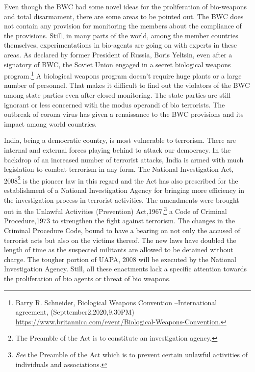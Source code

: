 \begin{multicols}{2}

\noi
Even though the BWC had some novel ideas for the proliferation of bio-weapons and total
disarmament, there are some areas to be pointed out. The BWC does not contain any
provision for monitoring the members about the compliance of the provisions. Still, in many
parts of the world, among the member countries themselves, experimentations in bio-agents
are going on with experts in these areas. As declared by former President of Russia, Boris
Yeltsin, even after a signatory of BWC, the Soviet Union engaged in a secret biological 
weapons program.\footnote{Barry R. Schneider, Biological Weapons Convention –International agreement, (Septtember2,2020,9.30PM) \url{https://www.britannica.com/event/Biological-Weapons-Convention.}} A biological weapons program doesn't require huge plants or a large
number of personnel. That makes it difficult to find out the violators of the BWC among state
parties even after closed monitoring. The state parties are still ignorant or less concerned with
the modus operandi of bio terrorists. The outbreak of corona virus has given a renaissance to
the BWC provisions and its impact among world countries.


\noi
India, being a democratic country, is most vulnerable to terrorism. There are internal and
external forces playing behind to attack our democracy. In the backdrop of an increased
number of terrorist attacks, India is armed with much legislation to combat terrorism in any
form. The National Investigation Act, 2008\footnote{The Preamble of the Act is to constitute an investigation agency.} is the pioneer law in this regard and the Act has also prescribed for the establishment of a National Investigation Agency for bringing more efficiency in the investigation process in terrorist activities. The amendments were brought
out in the Unlawful Activities (Prevention) Act,1967,\footnote{\textit{See} the Preamble of the Act which is to prevent certain unlawful activities of individuals and associations.} a Code of Criminal Procedure,1973 to
strengthen the fight against terrorism. The changes in the Criminal Procedure Code, bound to
have a bearing on not only the accused of terrorist acts but also on the victims thereof. The
new laws have doubled the length of time as the suspected militants are allowed to be
detained without charge. The tougher portion of UAPA, 2008 will be executed by the
National Investigation Agency. Still, all these enactments lack a specific attention towards the
proliferation of bio agents or threat of bio weapons.


\end{multicols}
